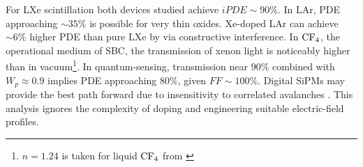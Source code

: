 For LXe scintillation both devices studied achieve $iPDE \sim 90\%$. In LAr, PDE approaching $\sim35\%$ is possible for very thin oxides. Xe-doped LAr can achieve $\sim6\%$ higher PDE than pure LXe by via constructive interference. In $\ce{CF4}$, the operational medium of SBC\cite{sbc_snowmass2021}, the transmission of xenon light is noticeably higher than in vacuum\footnote{$n=1.24$ is taken for liquid $\ce{CF4}$ from \cite{index_cf4_chemPhys, index_cf4_french}}. In quantum-sensing, transmission near $90\%$ combined with $W_p \approx 0.9$ implies PDE approaching $80\%$, given $FF \sim 100\%$. Digital SiPMs may provide the best path forward due to insensitivity to correlated avalanches \cite{Pratte_2021}. This analysis ignores the complexity of doping and engineering suitable electric-field profiles.